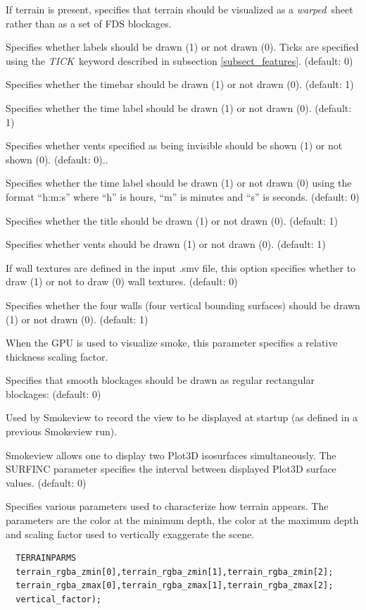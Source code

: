 \documentclass[11pt,twoside]{book}
\newcommand{\hitem}[1]{\item[{\bf #1} \hfill]}
\begin{document}
\hitem{SHOWTERRAIN} If terrain is present, specifies that terrain
should be visualized as a {\em warped}\ sheet
rather than as a set of FDS blockages.

\hitem{SHOWTICKS} Specifies whether labels should be drawn (1) or
not drawn (0).  Ticks are specified using the {\em TICK}\ keyword
described in subsection \ref{subsect_features}. (default: 0)

\hitem{SHOWTIMEBAR}Specifies whether the timebar should be drawn
(1) or not drawn (0). (default: 1)

\hitem{SHOWTIMELABEL} Specifies whether the time label should be
drawn (1) or not drawn (0). (default: 1)

\hitem{SHOWTRANSPARENTVENTS} Specifies whether vents specified as being invisible should be
shown (1) or not shown (0). (default: 0)..

\hitem{SHOWHMSTIMELABEL}Specifies whether the time label should be
drawn (1) or not drawn (0) using the format ``h:m:s'' where ``h''
is hours, ``m'' is minutes and ``s'' is seconds.  (default: 0)

\hitem{SHOWTITLE}Specifies whether
the title should be drawn (1) or not drawn (0).
(default: 1)

\hitem{SHOWVENTS} Specifies whether vents should be drawn
(1) or not drawn (0).  (default: 1)

\hitem{SHOWALLTEXTURES} If wall textures are defined in the input .smv file, this
option specifies whether to draw (1) or not to draw (0) wall textures.
(default: 0)


\hitem{SHOWWALLS}Specifies whether
the four walls (four vertical bounding surfaces) should be drawn (1) or not drawn (0).
(default: 1)

\hitem{SMOKERTHICK} When the GPU is used to visualize smoke, this parameter specifies a
relative thickness scaling factor.

\hitem{SMOOTHBLOCKSOLID}  Specifies that smooth blockages should
be drawn as regular rectangular blockages: (default: 0)

\hitem{STARTUPVIEW}Used by Smokeview to record the view to be
displayed at startup (as defined in a previous Smokeview run).

\hitem{SURFINC}Smokeview allows one to display two Plot3D
isosurfaces simultaneously.  The SURFINC parameter specifies the
interval between displayed Plot3D surface values. (default: 0)

\hitem{TERRAINPARMS} Specifies various parameters used to characterize
how terrain appears.  The parameters are the color at the minimum depth,
the color at the maximum depth and scaling factor used to vertically exaggerate
the scene.
\begin{lstlisting}
  TERRAINPARMS
  terrain_rgba_zmin[0],terrain_rgba_zmin[1],terrain_rgba_zmin[2];
  terrain_rgba_zmax[0],terrain_rgba_zmax[1],terrain_rgba_zmax[2];
  vertical_factor);
\end{lstlisting}
\end{document}
